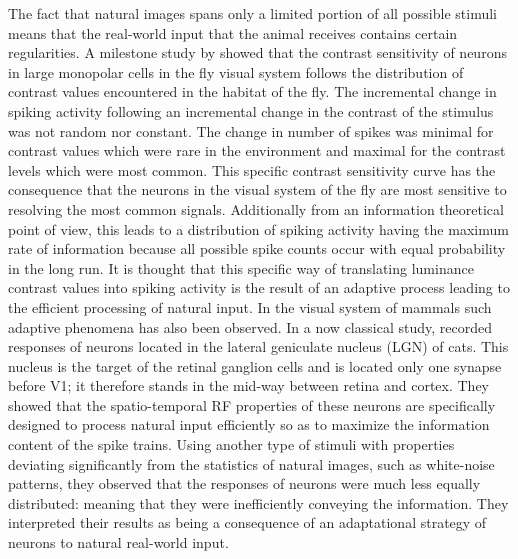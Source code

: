 The fact that natural images spans only a limited portion of all possible
stimuli means that the real-world input that the animal receives contains
certain regularities. A milestone study by \cite{laughlin1981a} showed that
the contrast sensitivity of neurons in large monopolar cells in the fly
visual system follows the distribution of contrast values encountered in
the habitat of the fly. The incremental change in spiking activity
following an incremental change in the contrast of the stimulus was not
random nor constant. The change in number of spikes was minimal for
contrast values which were rare in the environment and maximal for the
contrast levels which were most common. This specific contrast sensitivity
curve has the consequence that the neurons in the visual system of the fly
are most sensitive to resolving the most common signals. Additionally from
an information theoretical point of view, this leads to a distribution of
spiking activity having the maximum rate of information because all
possible spike counts occur with equal probability in the long run. It is
thought that this specific way of translating luminance contrast values
into spiking activity is the result of an adaptive process leading to the
efficient processing of natural input. In the visual system of mammals such
adaptive phenomena has also been observed. In a now classical study,
\cite{dan1996a} recorded responses of neurons located in the lateral
geniculate nucleus (LGN)  of
cats. This nucleus is the target of the retinal ganglion cells and is
located only one synapse before V1; it therefore stands in the mid-way
between retina and cortex. They showed that the spatio-temporal RF
properties of these neurons are specifically designed to process natural
input efficiently so as to maximize the information content of the spike
trains.  Using another type of stimuli with properties deviating
significantly from the statistics of natural images, such as white-noise
patterns, they observed that the responses of neurons were much less
equally distributed: meaning that they were inefficiently conveying the
information. They interpreted their results as being a consequence of an
adaptational strategy of neurons to natural real-world input. 


